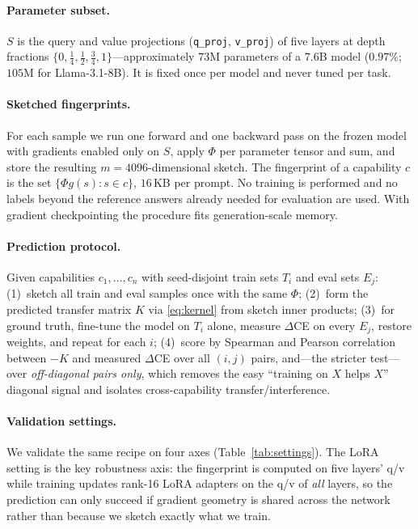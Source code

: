 \documentclass{article} %
\begin{document}
\paragraph{Parameter subset.}
$S$ is the query and value projections (\texttt{q\_proj}, \texttt{v\_proj}) of five layers at
depth fractions $\{0,\tfrac14,\tfrac12,\tfrac34,1\}$---approximately $73$M parameters of a $7.6$B model ($0.97\%$; $105$M for Llama-3.1-8B). It is fixed once per model and never tuned per task.

\paragraph{Sketched fingerprints.}
For each sample we run one forward and one backward pass on the frozen model with gradients
enabled only on $S$, apply $\Phi$ per parameter tensor and sum, and store the resulting
$m=4096$-dimensional sketch. The fingerprint of a capability $c$ is the set
$\{\Phi g(s): s\in c\}$, $16$\,KB per prompt. No training is performed and no labels beyond the
reference answers already needed for evaluation are used. With gradient checkpointing the
procedure fits generation-scale memory.

\paragraph{Prediction protocol.}
Given capabilities $c_1,\dots,c_n$ with seed-disjoint train sets $T_i$ and eval sets $E_j$:
(1)~sketch all train and eval samples once with the same $\Phi$;
(2)~form the predicted transfer matrix $K$ via \eqref{eq:kernel} from sketch inner products;
(3)~for ground truth, fine-tune the model on $T_i$ alone, measure $\Delta$CE on every $E_j$,
restore weights, and repeat for each $i$;
(4)~score by Spearman and Pearson correlation between $-K$ and measured $\Delta$CE over all
$(i,j)$ pairs, and---the stricter test---over \emph{off-diagonal pairs only}, which removes the
easy ``training on $X$ helps $X$'' diagonal signal and isolates cross-capability
transfer/interference.

\paragraph{Validation settings.}
We validate the same recipe on four axes (Table~\ref{tab:settings}). The LoRA setting is the key
robustness axis: the fingerprint is computed on five layers' q/v while training updates rank-16
LoRA adapters on the q/v of \emph{all} layers, so the prediction can only succeed if gradient
geometry is shared across the network rather than because we sketch exactly what we train.
\end{document}
